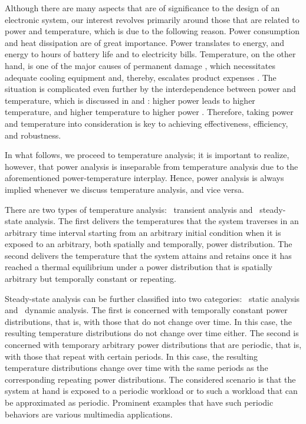 Although there are many aspects that are of significance to the design of an
electronic system, our interest revolves primarily around those that are related
to power and temperature, which is due to the following reason. Power
consumption and heat dissipation are of great importance. Power translates to
energy, and energy to hours of battery life and to electricity bills.
Temperature, on the other hand, is one of the major causes of permanent damage
\cite{jedec2016}, which necessitates adequate cooling equipment and, thereby,
escalates product expenses \cite{chaudhry2015}. The situation is complicated
even further by the interdependence between power and temperature, which is
discussed in  and : higher power leads
to higher temperature, and higher temperature to higher power \cite{liu2007}.
Therefore, taking power and temperature into consideration is key to achieving
effectiveness, efficiency, and robustness.

In what follows, we proceed to temperature analysis; it is important to realize,
however, that power analysis is inseparable from temperature analysis due to the
aforementioned power-temperature interplay. Hence, power analysis is always
implied whenever we discuss temperature analysis, and vice versa.

There are two types of temperature analysis: \one~transient analysis and
\two~steady-state analysis. The first delivers the temperatures that the system
traverses in an arbitrary time interval starting from an arbitrary initial
condition when it is exposed to an arbitrary, both spatially and temporally,
power distribution. The second delivers the temperature that the system attains
and retains once it has reached a thermal equilibrium under a power distribution
that is spatially arbitrary but temporally constant or repeating.

Steady-state analysis can be further classified into two categories: \one~static
analysis and \two~dynamic analysis. The first is concerned with temporally
constant power distributions, that is, with those that do not change over time.
In this case, the resulting temperature distributions do not change over time
either. The second is concerned with temporary arbitrary power distributions
that are periodic, that is, with those that repeat with certain periods. In this
case, the resulting temperature distributions change over time with the same
periods as the corresponding repeating power distributions. The considered
scenario is that the system at hand is exposed to a periodic workload or to such
a workload that can be approximated as periodic. Prominent examples that have
such periodic behaviors are various multimedia applications.

